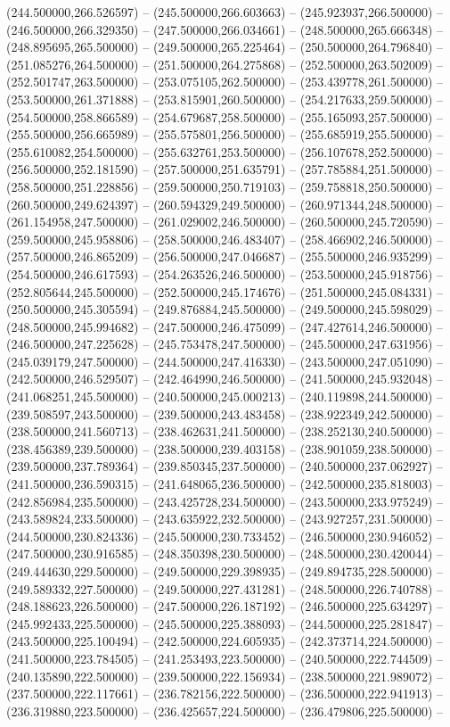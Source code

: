    (244.500000,266.526597) -- (245.500000,266.603663) -- (245.923937,266.500000) -- (246.500000,266.329350) -- (247.500000,266.034661) -- (248.500000,265.666348) -- (248.895695,265.500000) -- (249.500000,265.225464) -- (250.500000,264.796840) -- (251.085276,264.500000) -- (251.500000,264.275868) -- (252.500000,263.502009) -- (252.501747,263.500000) -- (253.075105,262.500000) -- (253.439778,261.500000) -- (253.500000,261.371888) -- (253.815901,260.500000) -- (254.217633,259.500000) -- (254.500000,258.866589) -- (254.679687,258.500000) -- (255.165093,257.500000) -- (255.500000,256.665989) -- (255.575801,256.500000) -- (255.685919,255.500000) -- (255.610082,254.500000) -- (255.632761,253.500000) -- (256.107678,252.500000) -- (256.500000,252.181590) -- (257.500000,251.635791) -- (257.785884,251.500000) -- (258.500000,251.228856) -- (259.500000,250.719103) -- (259.758818,250.500000) -- (260.500000,249.624397) -- (260.594329,249.500000) -- (260.971344,248.500000) -- (261.154958,247.500000) -- (261.029002,246.500000) -- (260.500000,245.720590) -- (259.500000,245.958806) -- (258.500000,246.483407) -- (258.466902,246.500000) -- (257.500000,246.865209) -- (256.500000,247.046687) -- (255.500000,246.935299) -- (254.500000,246.617593) -- (254.263526,246.500000) -- (253.500000,245.918756) -- (252.805644,245.500000) -- (252.500000,245.174676) -- (251.500000,245.084331) -- (250.500000,245.305594) -- (249.876884,245.500000) -- (249.500000,245.598029) -- (248.500000,245.994682) -- (247.500000,246.475099) -- (247.427614,246.500000) -- (246.500000,247.225628) -- (245.753478,247.500000) -- (245.500000,247.631956) -- (245.039179,247.500000) -- (244.500000,247.416330) -- (243.500000,247.051090) -- (242.500000,246.529507) -- (242.464990,246.500000) -- (241.500000,245.932048) -- (241.068251,245.500000) -- (240.500000,245.000213) -- (240.119898,244.500000) -- (239.508597,243.500000) -- (239.500000,243.483458) -- (238.922349,242.500000) -- (238.500000,241.560713) -- (238.462631,241.500000) -- (238.252130,240.500000) -- (238.456389,239.500000) -- (238.500000,239.403158) -- (238.901059,238.500000) -- (239.500000,237.789364) -- (239.850345,237.500000) -- (240.500000,237.062927) -- (241.500000,236.590315) -- (241.648065,236.500000) -- (242.500000,235.818003) -- (242.856984,235.500000) -- (243.425728,234.500000) -- (243.500000,233.975249) -- (243.589824,233.500000) -- (243.635922,232.500000) -- (243.927257,231.500000) -- (244.500000,230.824336) -- (245.500000,230.733452) -- (246.500000,230.946052) -- (247.500000,230.916585) -- (248.350398,230.500000) -- (248.500000,230.420044) -- (249.444630,229.500000) -- (249.500000,229.398935) -- (249.894735,228.500000) -- (249.589332,227.500000) -- (249.500000,227.431281) -- (248.500000,226.740788) -- (248.188623,226.500000) -- (247.500000,226.187192) -- (246.500000,225.634297) -- (245.992433,225.500000) -- (245.500000,225.388093) -- (244.500000,225.281847) -- (243.500000,225.100494) -- (242.500000,224.605935) -- (242.373714,224.500000) -- (241.500000,223.784505) -- (241.253493,223.500000) -- (240.500000,222.744509) -- (240.135890,222.500000) -- (239.500000,222.156934) -- (238.500000,221.989072) -- (237.500000,222.117661) -- (236.782156,222.500000) -- (236.500000,222.941913) -- (236.319880,223.500000) -- (236.425657,224.500000) -- (236.479806,225.500000) -- 